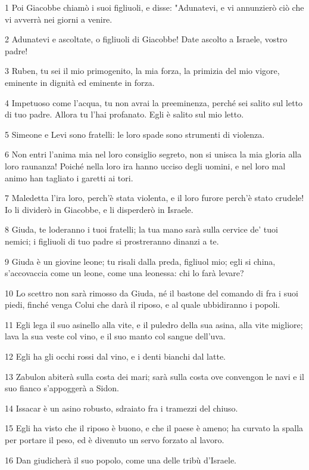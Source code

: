 \par 1 Poi Giacobbe chiamò i suoi figliuoli, e disse: "Adunatevi, e vi annunzierò ciò che vi avverrà nei giorni a venire.
\par 2 Adunatevi e ascoltate, o figliuoli di Giacobbe! Date ascolto a Israele, vostro padre!
\par 3 Ruben, tu sei il mio primogenito, la mia forza, la primizia del mio vigore, eminente in dignità ed eminente in forza.
\par 4 Impetuoso come l'acqua, tu non avrai la preeminenza, perché sei salito sul letto di tuo padre. Allora tu l'hai profanato. Egli è salito sul mio letto.
\par 5 Simeone e Levi sono fratelli: le loro spade sono strumenti di violenza.
\par 6 Non entri l'anima mia nel loro consiglio segreto, non si unisca la mia gloria alla loro raunanza! Poiché nella loro ira hanno ucciso degli uomini, e nel loro mal animo han tagliato i garetti ai tori.
\par 7 Maledetta l'ira loro, perch'è stata violenta, e il loro furore perch'è stato crudele! Io li dividerò in Giacobbe, e li disperderò in Israele.
\par 8 Giuda, te loderanno i tuoi fratelli; la tua mano sarà sulla cervice de' tuoi nemici; i figliuoli di tuo padre si prostreranno dinanzi a te.
\par 9 Giuda è un giovine leone; tu risali dalla preda, figliuol mio; egli si china, s'accovaccia come un leone, come una leonessa: chi lo farà levare?
\par 10 Lo scettro non sarà rimosso da Giuda, né il bastone del comando di fra i suoi piedi, finché venga Colui che darà il riposo, e al quale ubbidiranno i popoli.
\par 11 Egli lega il suo asinello alla vite, e il puledro della sua asina, alla vite migliore; lava la sua veste col vino, e il suo manto col sangue dell'uva.
\par 12 Egli ha gli occhi rossi dal vino, e i denti bianchi dal latte.
\par 13 Zabulon abiterà sulla costa dei mari; sarà sulla costa ove convengon le navi e il suo fianco s'appoggerà a Sidon.
\par 14 Issacar è un asino robusto, sdraiato fra i tramezzi del chiuso.
\par 15 Egli ha visto che il riposo è buono, e che il paese è ameno; ha curvato la spalla per portare il peso, ed è divenuto un servo forzato al lavoro.
\par 16 Dan giudicherà il suo popolo, come una delle tribù d'Israele.
